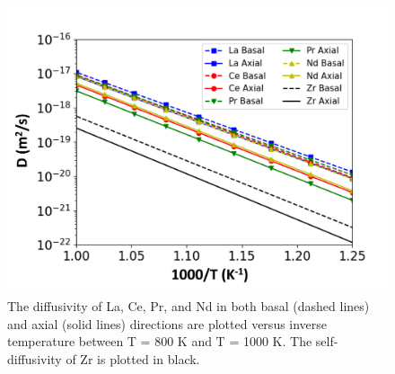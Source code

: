 \documentclass[preprint,12pt]{elsarticle}
\begin{document}
\FloatBarrier

\begin{figure}
    \centering
    \includegraphics[scale=0.2]{diff_all.jpg}
    \caption{The diffusivity of La, Ce, Pr, and Nd in both basal (dashed lines) and axial (solid lines) directions are plotted versus inverse temperature between T = 800 K and T = 1000 K. The self-diffusivity of Zr is plotted in black.}
    \label{fig:diffusion_all_lanthanides}
\end{figure}


\FloatBarrier

  

\end{document}
